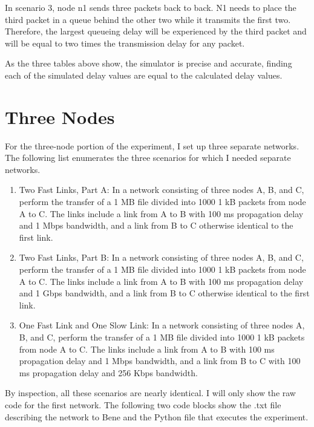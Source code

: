 \documentclass[11pt]{article}
\begin{document}
In scenario 3, node n1 sends three packets back to back. N1 needs to place the third packet in a queue behind the other two while it transmits the first two. Therefore, the largest queueing delay will be experienced by the third packet and will be equal to two times the transmission delay for any packet.

As the three tables above show, the simulator is precise and accurate, finding each of the simulated delay values are equal to the calculated delay values. 

\section{Three Nodes}

For the three-node portion of the experiment, I set up three separate networks. The following list enumerates the three scenarios for which I needed separate networks. 

\begin{enumerate}

\item Two Fast Links, Part A: In a network consisting of three nodes A, B, and C, perform the transfer of a 1 MB file divided into 1000 1 kB packets from node A to C. The links include a link from A to B with 100 ms propagation delay and 1 Mbps bandwidth, and a link from B to C otherwise identical to the first link.

\item Two Fast Links, Part B: In a network consisting of three nodes A, B, and C, perform the transfer of a 1 MB file divided into 1000 1 kB packets from node A to C. The links include a link from A to B with 100 ms propagation delay and 1 Gbps bandwidth, and a link from B to C otherwise identical to the first link.

\item One Fast Link and One Slow Link: In a network consisting of three nodes A, B, and C, perform the transfer of a 1 MB file divided into 1000 1 kB packets from node A to C. The links include a link from A to B with 100 ms propagation delay and 1 Mbps bandwidth, and a link from B to C with 100 ms propagation delay and 256 Kbps bandwidth.

\end{enumerate}

By inspection, all these scenarios are nearly identical. I will only show the raw code for the first network. The following two code blocks show the .txt file describing the network to Bene and the Python file that executes the experiment.
\end{document}
